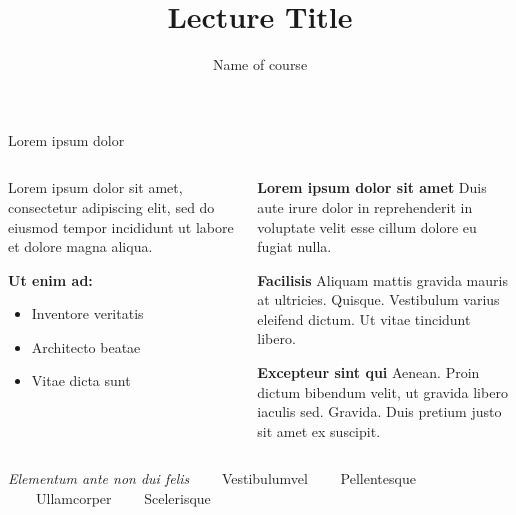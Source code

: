 \documentclass[aspectratio=169]{beamer}
\title{Lecture Title} %
\subtitle{Name of course} %
\author{} %
\begin{document}
\begin{frame}[plain]
  \titlepage
\end{frame}

\begin{frame}{Lorem ipsum dolor} %
\begin{columns}[T,onlytextwidth]
  \begin{column}{0.54\linewidth}
    \small
    Lorem ipsum dolor sit amet, consectetur adipiscing elit, sed do eiusmod tempor
    incididunt ut labore et dolore magna aliqua. %

    \vspace{0.6em}
    \textbf{Ut enim ad:}
    \begin{itemize}
      \item Inventore veritatis
      \item Architecto beatae
      \item Vitae dicta sunt
    \end{itemize} %
  \end{column}

  \begin{column}{0.43\linewidth}
    \begin{block}{\normalsize \textbf{Lorem ipsum dolor sit amet}}
      \footnotesize
      Duis aute irure dolor in reprehenderit in voluptate velit esse cillum dolore eu fugiat nulla.
    \end{block}

    \begin{block}{\normalsize \textbf{Facilisis}}
      \footnotesize
      Aliquam mattis gravida mauris at ultricies. Quisque. Vestibulum varius eleifend dictum. Ut vitae tincidunt libero.
    \end{block}

    \begin{block}{\normalsize \textbf{Excepteur sint qui}}
      \footnotesize
      Aenean. Proin dictum bibendum velit, ut gravida libero iaculis sed. Gravida. Duis pretium justo sit amet ex suscipit.
    \end{block}
  \end{column}
\end{columns}

\vspace{0.4em}
{\scriptsize
\textit{Elementum ante non dui felis} \ \ \textbar\ \
Vestibulumvel \ \ \textbar\ \
Pellentesque \ \ \textbar\ \
Ullamcorper \ \ \textbar\ \
Scelerisque
}
\end{frame}
\end{document}
